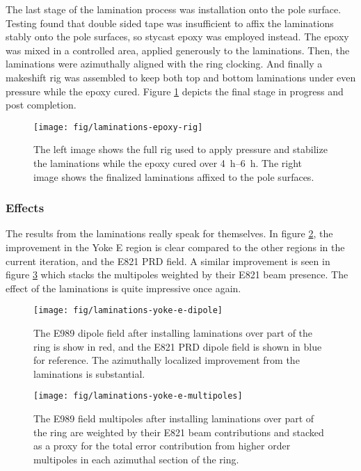 The last stage of the lamination process was installation onto the pole surface.  Testing found that double sided tape was insufficient to affix the laminations stably onto the pole surfaces, so stycast epoxy was employed instead.  The epoxy was mixed in a controlled area, applied generously to the laminations. Then, the laminations were azimuthally aligned with the ring clocking.  And finally a makeshift rig was assembled to keep both top and bottom laminations under even pressure while the epoxy cured.  Figure \ref{fig:laminations-epoxy-rig} depicts the final stage in progress and post completion.

\begin{figure}
\label{fig:laminations-epoxy-rig}
\texttt{[image: fig/laminations-epoxy-rig]}
\caption{The left image shows the full rig used to apply pressure and stabilize the laminations while the epoxy cured over \SIrange{4}{6}{\hour}.  The right image shows the finalized laminations affixed to the pole surfaces.}
\end{figure}

\subsubsection{Effects}

The results from the laminations really speak for themselves.  In figure \ref{fig:laminations-yoke-e-dipole}, the improvement in the Yoke E region is clear compared to the other regions in the current iteration, and the E821 PRD field.  A similar improvement is seen in figure \ref{fig:laminations-yoke-e-multipoles} which stacks the multipoles weighted by their E821 beam presence.  The effect of the laminations is quite impressive once again.

\begin{figure}
\label{fig:laminations-yoke-e-dipole}
\texttt{[image: fig/laminations-yoke-e-dipole]}
\caption{The E989 dipole field after installing laminations over part of the ring is show in red, and the E821 PRD dipole field is shown in blue for reference.  The azimuthally localized improvement from the laminations is substantial.}
\end{figure}

\begin{figure}
\label{fig:laminations-yoke-e-multipoles}
\texttt{[image: fig/laminations-yoke-e-multipoles]}
\caption{The E989 field multipoles after installing laminations over part of the ring are weighted by their E821 beam contributions and stacked as a proxy for the total error contribution from higher order multipoles in each azimuthal section of the ring.}
\end{figure}

